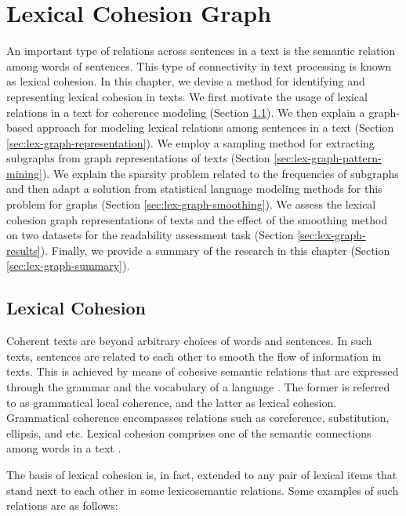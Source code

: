 
\chapter{Lexical Cohesion Graph}
\label{ch:lex-graph}

An important type of relations across sentences in a text is the semantic relation among words of sentences. 
This type of connectivity in text processing is known as lexical cohesion. 
In this chapter, we devise a method for identifying and representing lexical cohesion in texts. 
We first motivate the usage of lexical relations in a text for coherence modeling (Section \ref{sec:lex-graph-motivation}). 
We then explain a graph-based approach for modeling lexical relations among sentences in a text (Section \ref{sec:lex-graph-representation}). 
We employ a sampling method for extracting subgraphs from graph representations of texts (Section \ref{sec:lex-graph-pattern-mining}). 
We explain the sparsity problem related to the frequencies of subgraphs and then adapt a solution from statistical language modeling methods for this problem for graphs (Section \ref{sec:lex-graph-smoothing}). 
We assess the lexical cohesion graph representations of texts  and the effect of the smoothing method on two datasets for the readability assessment task (Section \ref{sec:lex-graph-results}). 
Finally, we provide a summary of the research in this chapter (Section \ref{sec:lex-graph-summary}).

\section{Lexical Cohesion}
\label{sec:lex-graph-motivation}

Coherent texts are beyond arbitrary choices of words and sentences.  
In such texts, sentences are related to each other to smooth the flow of information in texts. 
This is achieved by means of cohesive semantic relations that are expressed through the grammar and the vocabulary of a language \cite{halliday76}. 
The former is referred to as grammatical local coherence, and the latter as lexical cohesion.  
Grammatical coherence encompasses relations such as coreference, substitution, ellipsis, and etc. 
Lexical cohesion comprises one of the semantic connections among words in a text \cite{hoey91}. 

The basis of lexical cohesion is, in fact, extended to any pair of lexical items that stand next to each other in some lexicosemantic relations. 
Some examples of such relations are as follows: 

